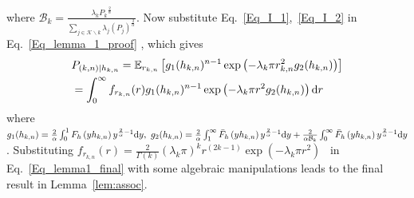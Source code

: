 \documentclass[final]{IEEEtran}
\begin{document}
where ${\mathcal{B}_k}=\frac{{\lambda_k}{P_k}^{\frac{2}{\alpha}}}{\sum_{j\in\mathcal{K}\backslash k}{\lambda_j}\left({P_j}\right)^{\frac{2}{\alpha}}}$. Now substitute Eq.~\ref{Eq_I_1},~\ref{Eq_I_2} in Eq.~\ref{Eq_lemma_1_proof} , which gives
\begin{align}
\label{Eq_lemma1_final}
&P_{(k,n)|h_{k,n}}=\mathbb{E}_{r_{k,n}}\left[g_1(h_{k,n})^{n-1}\exp\left(-\lambda_k\pi r_{k,n}^2g_2(h_{k,n})\right)\right]\nonumber\\
&=\int_{0}^{\infty}f_{r_{k,n}}(r)g_1(h_{k,n})^{n-1}\exp\left(-\lambda_k\pi r^2g_2(h_{k,n})\right){\rm d}r
\end{align}
where $g_1(h_{k,n})=\frac{2}{\alpha}\int_{0}^{1}F_h\left(yh_{k,n}\right)y^{\frac{2}{\alpha}-1}{\rm d}y,\ g_2(h_{k,n})=\frac{2}{\alpha}\int_{1}^{\infty}\bar{F}_h\left(yh_{k,n}\right)y^{\frac{2}{\alpha}-1}{\rm d}y+\frac{2}{\alpha\mathcal{B}_k}\int_{0}^{\infty}\bar{F}_h\left(yh_{k,n}\right)y^{\frac{2}{\alpha}-1}{\rm d}y$. Substituting $f_{r_{k,n}}(r)=\frac{2}{\Gamma(k)}(\lambda_k\pi)^k r^{(2k-1)}\exp(-\lambda_k\pi r^2)$~\cite{haenggi2012stochastic} in Eq.~\ref{Eq_lemma1_final} with some algebraic manipulations leads to the final result in Lemma~\ref{lem:assoc}.
\vspace{-3mm}
\end{document}
